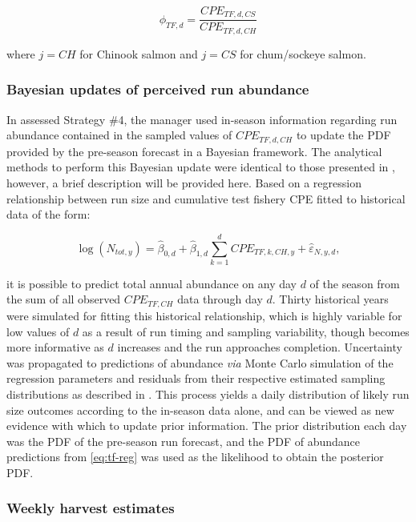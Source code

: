\documentclass[12pt,]{book}
\theoremstyle{definition}
\theoremstyle{definition}
\theoremstyle{definition}
\theoremstyle{remark}
\begin{document}
\begin{equation}
  \phi_{TF,d} = \frac{CPE_{TF,d,CS}}{CPE_{TF,d,CH}}
  \label{eq:get-tf-ratio}
\end{equation}

\noindent
where \(j = CH\) for Chinook salmon and \(j = CS\) for chum/sockeye
salmon.

\subsubsection{Bayesian updates of perceived run
abundance}\label{bayes-updates}

\noindent
In assessed Strategy \#4, the manager used in-season information
regarding run abundance contained in the sampled values of
\(CPE_{TF,d,CH}\) to update the PDF provided by the pre-season forecast
in a Bayesian framework. The analytical methods to perform this Bayesian
update were identical to those presented in
\citet{staton-catalano-2019}, however, a brief description will be
provided here. Based on a regression relationship between run size and
cumulative test fishery CPE fitted to historical data of the form:

\begin{equation}
  \log(N_{tot,y}) = \hat{\beta}_{0,d} + \hat{\beta}_{1,d}\sum_{k=1}^d{CPE_{TF,k,CH,y}} + \hat{\varepsilon}_{N,y,d},
  \label{eq:tf-reg}
\end{equation}

\noindent
it is possible to predict total annual abundance on any day \(d\) of the
season from the sum of all observed \(CPE_{TF,CH}\) data through day
\(d\). Thirty historical years were simulated for fitting this
historical relationship, which is highly variable for low values of
\(d\) as a result of run timing and sampling variability, though becomes
more informative as \(d\) increases and the run approaches completion.
Uncertainty was propagated to predictions of abundance \emph{via} Monte
Carlo simulation of the regression parameters and residuals from their
respective estimated sampling distributions as described in
\citet{staton-catalano-2019}. This process yields a daily distribution
of likely run size outcomes according to the in-season data alone, and
can be viewed as new evidence with which to update prior information.
The prior distribution each day was the PDF of the pre-season run
forecast, and the PDF of abundance predictions from \eqref{eq:tf-reg} was
used as the likelihood to obtain the posterior PDF.

\subsubsection{Weekly harvest estimates}\label{harv}
\end{document}
